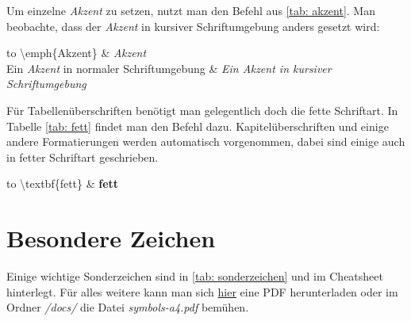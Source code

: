 Um einzelne \emph{Akzent} zu setzen, nutzt man den Befehl aus \ref{tab: akzent}. Man beobachte, dass der \emph{Akzent} in kursiver Schriftumgebung anders gesetzt wird:\\%
\begin{table}[h]%
\begin{tabu} to \textwidth {X[l]X[l]}%
\toprule%
\textbackslash emph\{Akzent\} & \emph{Akzent} \\%
Ein \emph{Akzent} in normaler Schriftumgebung & \textit{Ein \emph{Akzent} in kursiver Schriftumgebung}\\%
\bottomrule%
\end{tabu}%
\caption{Akzente}%
\label{tab: akzent}%
\end{table}%

Für Tabellenüberschriften benötigt man gelegentlich doch die fette Schriftart. In Tabelle \ref{tab: fett} findet man den Befehl dazu. Kapitelüberschriften und einige andere Formatierungen werden automatisch vorgenommen, dabei sind einige auch in fetter Schriftart geschrieben.\\%
\begin{table}[h]%
\begin{tabu} to \textwidth {X[l]X[l]}%
\toprule%
\textbackslash textbf\{fett\} & \textbf{fett} \\%
\bottomrule%
\end{tabu}%
\caption{Fette Schrift}%
\label{tab: fett}%
\end{table}%
%
\section{Besondere Zeichen}%
Einige wichtige Sonderzeichen sind in \ref{tab: sonderzeichen} und im Cheatsheet hinterlegt. Für alles weitere kann man sich \href{http://www.ctan.org/tex-archive/info/symbols/comprehensive/symbols-a4.pdf}{hier} eine PDF herunterladen oder im Ordner \emph{/docs/} die Datei \emph{symbols-a4.pdf} bemühen.%

